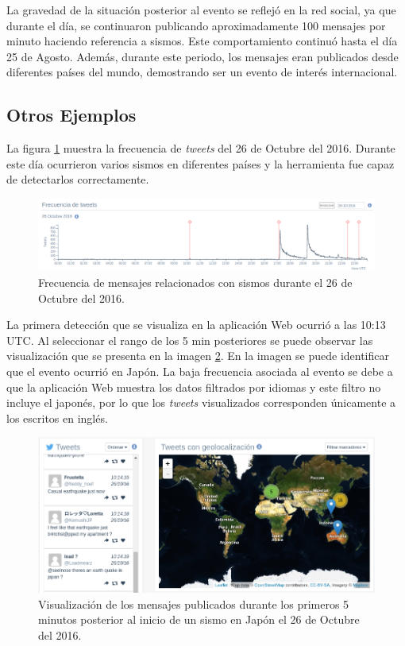 	La gravedad de la situación posterior al evento se reflejó en la red social, ya que durante el día, se continuaron publicando aproximadamente 100 mensajes por minuto haciendo referencia a sismos. Este comportamiento continuó hasta el día 25 de Agosto. Además, durante este periodo, los mensajes eran publicados desde diferentes países del mundo, demostrando ser un evento de interés internacional.
	
	
	\subsection{Otros Ejemplos}
	
	
	La figura \ref{fig:timeline-26Oct} muestra la frecuencia de \textit{tweets} del 26 de Octubre del 2016. Durante este día ocurrieron varios sismos en diferentes países y la herramienta fue capaz de detectarlos correctamente. 
	
	\begin{figure}[!h]
	  \centering
	  \includegraphics[width=\textwidth]{imagenes/26Octubrefreq.png}
	  \caption{Frecuencia de mensajes relacionados con sismos durante el 26 de Octubre del 2016.}
		\label{fig:timeline-26Oct}
	\end{figure}
	
	La primera detección que se visualiza en la aplicación Web ocurrió a las 10:13 UTC. Al seleccionar el rango de los 5 min posteriores se puede observar las visualización que se presenta en la imagen \ref{fig:sismojapon}. En la imagen se puede identificar que el evento ocurrió en Japón. La baja frecuencia asociada al evento se debe a que la aplicación Web muestra los datos filtrados por idiomas y este filtro no incluye el japonés, por lo que los \textit{tweets} visualizados corresponden únicamente a los escritos en inglés. 
	
	\begin{figure}[!h]
	  \centering
	  \includegraphics[width=\textwidth]{imagenes/sismoJapon.png}
	  \caption{Visualización de los mensajes publicados durante los primeros 5 minutos posterior al inicio de un sismo en Japón el 26 de Octubre del 2016.}
		\label{fig:sismojapon}
	\end{figure}
	
